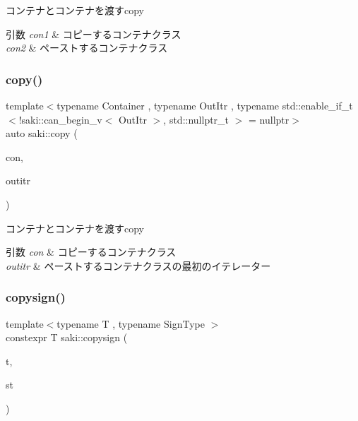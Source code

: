 コンテナとコンテナを渡すcopy 


\begin{DoxyParams}{引数}
{\em con1} & コピーするコンテナクラス \\
\hline
{\em con2} & ペーストするコンテナクラス \\
\hline
\end{DoxyParams}
\mbox{\label{namespacesaki_a810f851279b6d10acc3892433f7036fd}} 
\subsubsection{\texorpdfstring{copy()}{copy()}\hspace{0.1cm}{\footnotesize\ttfamily [2/2]}}
{\footnotesize\ttfamily template$<$typename Container , typename Out\+Itr , typename std\+::enable\+\_\+if\+\_\+t$<$!saki\+::can\+\_\+begin\+\_\+v$<$ Out\+Itr $>$, std\+::nullptr\+\_\+t $>$  = nullptr$>$ \\
auto saki\+::copy (\begin{DoxyParamCaption}\item[{Container \&\&}]{con,  }\item[{Out\+Itr}]{outitr }\end{DoxyParamCaption})}



コンテナとコンテナを渡すcopy 


\begin{DoxyParams}{引数}
{\em con} & コピーするコンテナクラス \\
\hline
{\em outitr} & ペーストするコンテナクラスの最初のイテレーター \\
\hline
\end{DoxyParams}
\mbox{\label{namespacesaki_a1791113a346dea4c2d7fd8e120016038}} 
\subsubsection{\texorpdfstring{copysign()}{copysign()}}
{\footnotesize\ttfamily template$<$typename T , typename Sign\+Type $>$ \\
constexpr T saki\+::copysign (\begin{DoxyParamCaption}\item[{const T \&}]{t,  }\item[{const Sign\+Type \&}]{st }\end{DoxyParamCaption})}



